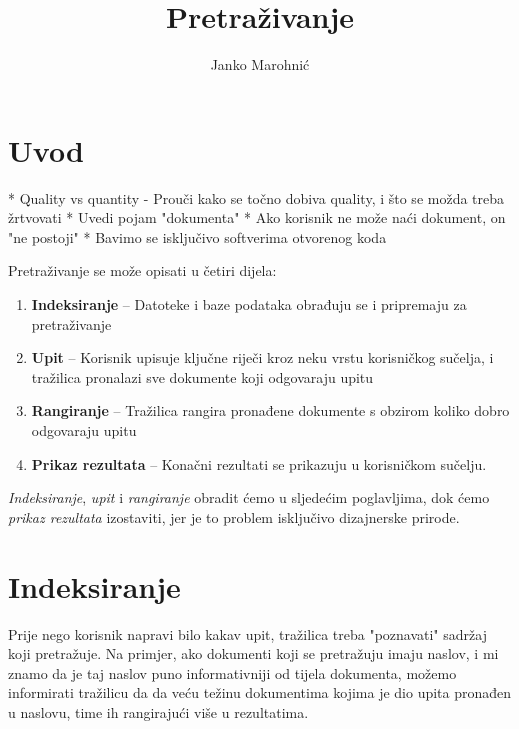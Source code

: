 \documentclass[11pt]{scrreprt}
\title{Pretraživanje}
\author{Janko Marohnić}
\begin{document}
\maketitle


\tableofcontents

\pagebreak


\chapter{Uvod}

* Quality vs quantity
  - Prouči kako se točno dobiva quality, i što se možda treba žrtvovati
* Uvedi pojam "dokumenta"
* Ako korisnik ne može naći dokument, on "ne postoji"
* Bavimo se isključivo softverima otvorenog koda

Pretraživanje se može opisati u četiri dijela:

\begin{enumerate}
  \item \textbf{Indeksiranje} – Datoteke i baze podataka obrađuju se i pripremaju za pretraživanje
  \item \textbf{Upit} – Korisnik upisuje ključne riječi kroz neku vrstu korisničkog sučelja, i tražilica pronalazi sve dokumente koji odgovaraju upitu
  \item \textbf{Rangiranje} – Tražilica rangira pronađene dokumente s obzirom koliko dobro odgovaraju upitu
  \item \textbf{Prikaz rezultata} – Konačni rezultati se prikazuju u korisničkom sučelju.
\end{enumerate}

\textit{Indeksiranje}, \textit{upit} i \textit{rangiranje} obradit ćemo u sljedećim poglavljima, dok ćemo \textit{prikaz rezultata} izostaviti, jer je to problem isključivo dizajnerske prirode.

\chapter{Indeksiranje}

Prije nego korisnik napravi bilo kakav upit, tražilica treba "poznavati" sadržaj koji pretražuje. Na primjer, ako dokumenti koji se pretražuju imaju naslov, i mi znamo da je taj naslov puno informativniji od tijela dokumenta, možemo informirati tražilicu da da veću težinu dokumentima kojima je dio upita pronađen u naslovu, time ih rangirajući više u rezultatima.
\end{document}
